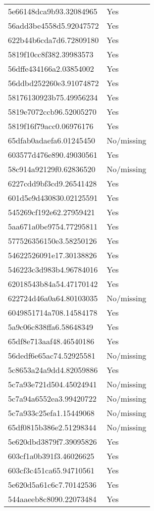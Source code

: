 \begin{tabular}{ll}
5e66148dca9b93.32084965 & Yes \\
56add3be4558d5.92047572 & Yes \\
622b44b6cda7d6.72809180 & Yes \\
5819f10cc8f382.39983573 & Yes \\
56dffe434166a2.03854002 & Yes \\
56ddbd252260e3.91074872 & Yes \\
58176130923b75.49956234 & Yes \\
5819e7072ccb96.52005270 & Yes \\
5819f16f79acc0.06976176 & Yes \\
65dfab0adaefa6.01245450 & No/missing \\
603577d476e890.49030561 & Yes \\
58c914a92129f0.62836520 & No/missing \\
6227cdd9bf3cd9.26541428 & Yes \\
601d5e9d430830.02125591 & Yes \\
545269cf192e62.27959421 & Yes \\
5aa671a0be9754.77295811 & Yes \\
577526356150e3.58250126 & Yes \\
54622526091e17.30138826 & Yes \\
546223c3d983b4.96784016 & Yes \\
62018543b84a54.47170142 & Yes \\
622724d46a0a64.80103035 & No/missing \\
6049851714a708.14584178 & Yes \\
5a9c06c838ffa6.58648349 & Yes \\
65df8e713aaf48.46540186 & Yes \\
56dedf6e65ac74.52925581 & No/missing \\
5c8653a24a9dd4.82059886 & Yes \\
5c7a93e721d504.45024941 & No/missing \\
5c7a94a6552ea3.99420722 & No/missing \\
5c7a933c25efa1.15449068 & No/missing \\
65df0815b386e2.51298344 & No/missing \\
5e620dbd3879f7.39095826 & Yes \\
603cf1a0b391f3.46026625 & Yes \\
603cf3c451ca65.94710561 & Yes \\
5e620d5a61c6c7.70142536 & Yes \\
544aaeeb8c8090.22073484 & Yes \\

\end{tabular}

